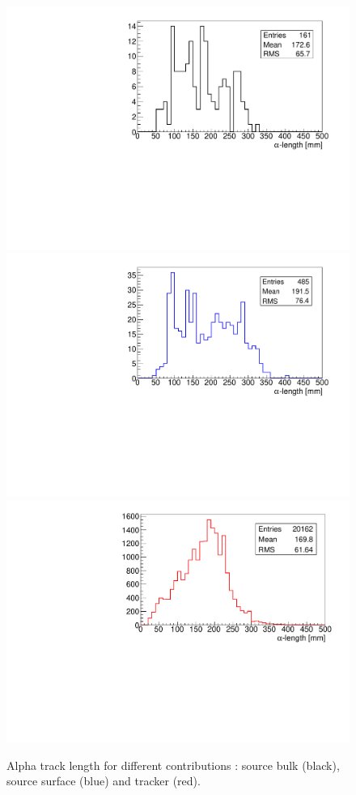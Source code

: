 \documentclass[main.tex]{subfiles}
\begin{document}
\begin{figure}[h!]
\begin{center}
\includegraphics[scale=0.38]{pictures/Chap5/length_alpha_tracker_selection_bulk.pdf}
\includegraphics[scale=0.38]{pictures/Chap5/length_alpha_tracker_selection_surface.pdf}
\includegraphics[scale=0.38]{pictures/Chap5/length_alpha_tracker_selection_tracker.pdf}
\caption{Alpha track length for different contributions : source bulk (black), source surface (blue) and tracker (red).}
\label{alpha_length_tracker_selection}
\end{center}
\end{figure}
\end{document}
